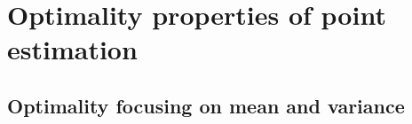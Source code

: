 

\section{Optimality properties of point estimation}

\subsection{Optimality focusing on mean and variance}

